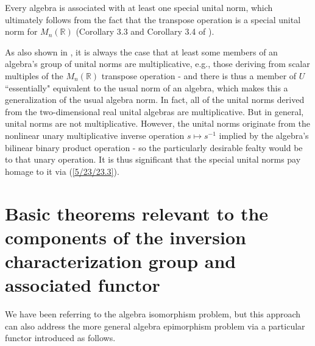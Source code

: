 \documentclass{amsart}
\numberwithin{equation}{section}
\theoremstyle{definition}
\numberwithin{theorem}{section}
\begin{document}
Every algebra is associated with at least one special unital norm, which ultimately follows from the fact that the transpose operation is a special unital norm for $M_n(\mathbb{R})$ (Corollary 3.3 and Corollary 3.4 of \cite{fgreensite:2023}).

As also shown in \cite{fgreensite:2023}, it is always the case that at least some members of an algebra's group of unital norms are multiplicative, e.g., those deriving from scalar multiples of the $M_n(\mathbb{R})$ transpose operation - and there is thus a member of $ U$ ``essentially" equivalent to the usual norm of an algebra, which makes this a generalization of the usual algebra norm.  In fact, all of the unital norms derived from the two-dimensional real unital algebras are multiplicative.   But in general, unital norms are not multiplicative.  However, the unital norms originate from the nonlinear unary multiplicative inverse operation $s\mapsto s^{-1}$ implied by the algebra's bilinear binary product operation - so the particularly desirable fealty would be to that unary operation.  It is thus significant that the special unital norms pay homage to it via (\ref{5/23/23.3}). 



\section{Basic theorems relevant to the components of the inversion characterization group and associated functor}

We have been referring to the algebra isomorphism problem, but this approach can also address the more general algebra epimorphism problem via a particular functor introduced as follows.  
\end{document}

